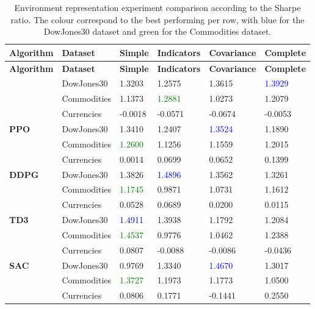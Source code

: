 \begin{longtable}{|p{2cm}|p{2.2cm}|p{2cm}|p{2cm}|p{2.2cm}|p{2cm}|}
    \hline
    \textbf{Algorithm} & \textbf{Dataset} & \textbf{Simple} & \textbf{Indicators} & \textbf{Covariance} & \textbf{Complete} \\ \midrule
    \endfirsthead

    \hline
    \textbf{Algorithm} & \textbf{Dataset} & \textbf{Simple} & \textbf{Indicators} & \textbf{Covariance} & \textbf{Complete}  \\ \midrule
    \endhead

    \caption{Environment representation experiment comparison according to the Sharpe ratio. The colour correspond to the best performing per row, with blue for the DowJones30 dataset and green for the Commodities dataset.}
    \label{tab:experiment_environment_sharpe}

    \endfoot

    \hline  
    \multirow{3}{*}{\textbf{A2C}}
    & DowJones30 & 1.3203 & 1.2575 & 1.3615 & \textcolor{blue}{1.3929} \\ \cline{2-6}
    & Commodities & 1.1373 & \textcolor{green}{1.2881} & 1.0273 & 1.2079 \\ \cline{2-6}
    & Currencies & -0.0018 & -0.0571 & -0.0674 & -0.0053 \\ \midrule

    \multirow{3}{*}{\textbf{PPO}}
    & DowJones30 & 1.3410 & 1.2407 & \textcolor{blue}{1.3524} & 1.1890 \\ \cline{2-6}
    & Commodities & \textcolor{green}{1.2600} & 1.1256 & 1.1559 & 1.2015 \\ \cline{2-6}
    & Currencies & 0.0014 & 0.0699 & 0.0652 & 0.1399 \\ \midrule

    \multirow{3}{*}{\textbf{DDPG}}
    & DowJones30 & 1.3826 & \textcolor{blue}{1.4896} & 1.3562 & 1.3261 \\ \cline{2-6}
    & Commodities & \textcolor{green}{1.1745} & 0.9871 & 1.0731 & 1.1612 \\ \cline{2-6}
    & Currencies & 0.0528 & 0.0689 & 0.0200 & 0.0115 \\ \midrule

    \multirow{3}{*}{\textbf{TD3}}
    & DowJones30 & \textcolor{blue}{1.4911} & 1.3938 & 1.1792 & 1.2084 \\ \cline{2-6}
    & Commodities & \textcolor{green}{1.4537} & 0.9776 & 1.0462 & 1.2388 \\ \cline{2-6}
    & Currencies & 0.0807 & -0.0088 & -0.0086 & -0.0436 \\ \midrule

    \multirow{3}{*}{\textbf{SAC}}
    & DowJones30 & 0.9769 & 1.3340 & \textcolor{blue}{1.4670} & 1.3017 \\ \cline{2-6}
    & Commodities & \textcolor{green}{1.3727} & 1.1973 & 1.1773 & 1.0500 \\ \cline{2-6}
    & Currencies & 0.0806 & 0.1771 & -0.1441 & 0.2550 \\ \midrule

\end{longtable}